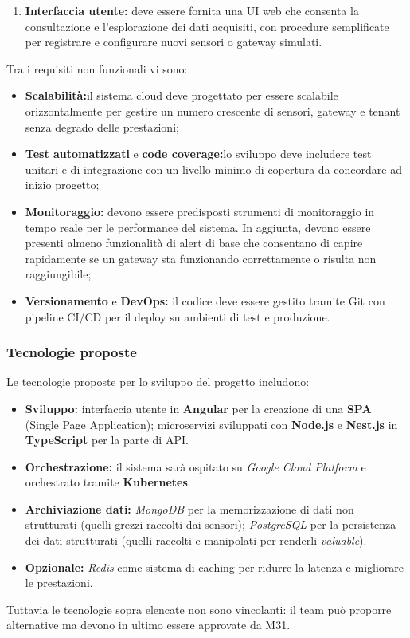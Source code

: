 \documentclass[a4paper,11pt]{article}
\begin{document}
\begin{enumerate}[noitemsep, topsep=0pt]
  \item \textbf{Interfaccia utente:} deve essere fornita una UI web che consenta la consultazione e l'esplorazione dei dati acquisiti, 
  con procedure semplificate per registrare e configurare nuovi sensori o gateway simulati.
\end{enumerate}
Tra i requisiti non funzionali vi sono: 
\begin{itemize}[noitemsep, topsep=0pt]
  \item \textbf{Scalabilità:}il sistema cloud deve progettato per essere scalabile orizzontalmente per gestire
un numero crescente di sensori, gateway e tenant senza degrado delle prestazioni;
  \item \textbf{Test automatizzati} e \textbf{code coverage:}lo sviluppo deve includere test unitari e di integrazione
con un livello minimo di copertura da concordare ad inizio progetto;
  \item \textbf{Monitoraggio:} devono essere predisposti strumenti di monitoraggio in tempo reale per le performance del sistema. 
  In aggiunta, devono essere presenti almeno funzionalità di alert di base che consentano di capire rapidamente 
  se un gateway sta funzionando correttamente o risulta non raggiungibile;
  \item \textbf{Versionamento} e \textbf{DevOps:} il codice deve essere gestito tramite Git con pipeline CI/CD 
  per il deploy su ambienti di test e produzione.
\end{itemize}

\subsubsection{Tecnologie proposte}
Le tecnologie proposte per lo sviluppo del progetto includono:
\begin{itemize}[noitemsep, topsep=0pt]
  \item \textbf{Sviluppo:} 
  interfaccia utente in \textbf{Angular} per la creazione di una \textbf{SPA} (Single Page Application); 
  microservizi sviluppati con \textbf{Node.js} e \textbf{Nest.js} in \textbf{TypeScript} per la parte di API.
  
  \item \textbf{Orchestrazione:} 
  il sistema sarà ospitato su \textit{Google Cloud Platform} e orchestrato tramite \textbf{Kubernetes}.
  
  \item \textbf{Archiviazione dati:} 
  \textit{MongoDB} per la memorizzazione di dati non strutturati (quelli grezzi raccolti dai sensori); 
  \textit{PostgreSQL} per la persistenza dei dati strutturati (quelli raccolti e manipolati per renderli \textit{valuable}).
  
  \item \textbf{Opzionale:} 
  \textit{Redis} come sistema di caching per ridurre la latenza e migliorare le prestazioni.
\end{itemize}
Tuttavia le tecnologie sopra elencate non sono vincolanti: il team può proporre alternative ma devono in ultimo essere approvate da M31.
\end{document}
